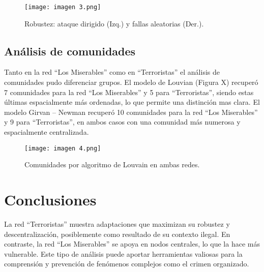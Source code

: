 \documentclass{article}
\begin{document}
\begin{figure}[h]
  \centering
  \texttt{[image: imagen 3.png]}
  \caption{Robustez: ataque dirigido (Izq.) y fallas aleatorias (Der.).}
  \label{fig:robustez}
\end{figure}



\subsection{Análisis de comunidades}

Tanto en la red “Los Miserables” como en “Terroristas” el análisis de comunidades pudo diferenciar grupos. El modelo de Louvian (Figura X) recuperó 7 comunidades para la red “Los Miserables” y 5 para “Terroristas”, siendo estas últimas espacialmente más ordenadas, lo que permite una distinción mas clara. El modelo Girvan – Newman recuperó 10 comunidades para la red “Los Miserables” y 9 para “Terroristas”, en ambos casos con una comunidad más numerosa y espacialmente centralizada.


\begin{figure}[h]
  \centering
  \texttt{[image: imagen 4.png]}
  \caption{Comunidades por algoritmo de Louvain en ambas redes.}
  \label{fig:comunidades}
\end{figure}

\section{Conclusiones}

La red “Terroristas” muestra adaptaciones que maximizan su robustez y descentralización, posiblemente como resultado de su contexto ilegal. En contraste, la red “Los Miserables” se apoya en nodos centrales, lo que la hace más vulnerable. Este tipo de análisis puede aportar herramientas valiosas para la comprensión y prevención de fenómenos complejos como el crimen organizado.



\end{document}
